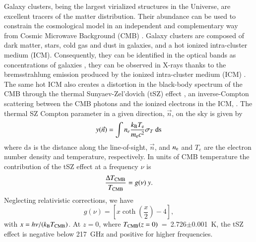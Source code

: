 \documentclass[traditabstract,a4,twocolumn]{aa}
\begin{document}
\label{sec:theory}

Galaxy clusters, being the largest virialized structures in the
Universe, are excellent tracers of the matter distribution.
Their abundance can be used to constrain the cosmological model in an independent and complementary way from Cosmic Microwave Background (CMB) \citep[see e.g.,][]{planckXXI,planck2015cosmo,hur17,sal18}.  Galaxy clusters are composed
of dark matter, stars, cold gas and dust in galaxies, and a hot
ionized intra-cluster medium (ICM).  Consequently, they can be
identified in the optical bands as concentrations of galaxies
\citep[see e.g.][]{abe89,gla05,koe07,ryk13}, they can be observed in
X-rays thanks to the bremsstrahlung emission produced by the ionized
intra-cluster medium (ICM) \citep[see
  e.g.][]{boh00,ebe00,ebe01,boh01}. The same hot ICM also creates a
distortion in the black-body spectrum of the CMB through the thermal Sunyaev-Zel'dovich (tSZ) effect
\citep{sun69,sun72}, an inverse-Compton scattering between the CMB photons and the ionized electrons in the ICM, \citep[see e.g.][for reviews]{bir99,car02}. The  thermal SZ Compton parameter in a given direction, $\vec{n}$, on the sky is given by
\begin{equation}
y (\vec{n}) = \int n_{e} \frac{k_{\rm{B}} T_{\rm{e}}}{m_{\rm{e}} c^{2}
} \sigma_{T} \ \rm{d}s
\label{comppar}
\end{equation}
where d$s$ is the distance along the line-of-sight, $\vec{n}$, and $n_{\rm{e}}$
and $T_{e}$ are the electron number density and temperature,
respectively.
In units of CMB temperature the contribution of the tSZ effect at a frequency $\nu$ is
\begin{equation}
\frac{\Delta T_{\rm{CMB}}}{T_{\rm{CMB}} }= g(\nu) \ y.
\end{equation}
Neglecting relativistic corrections, we have 
\begin{equation}
g(\nu) = \left[ x\coth \left(\frac{x}{2}\right) - 4 \right],
\label{szspec}
\end{equation}
with $ x=h \nu/(k_{\rm{B}} T_{\rm{CMB}})$. At $z=0$, where $T_{\rm
  CMB}(z=0)$~=~2.726$\pm$0.001~K, the tSZ effect is negative below
217~GHz and positive for higher frequencies.\\
\end{document}
